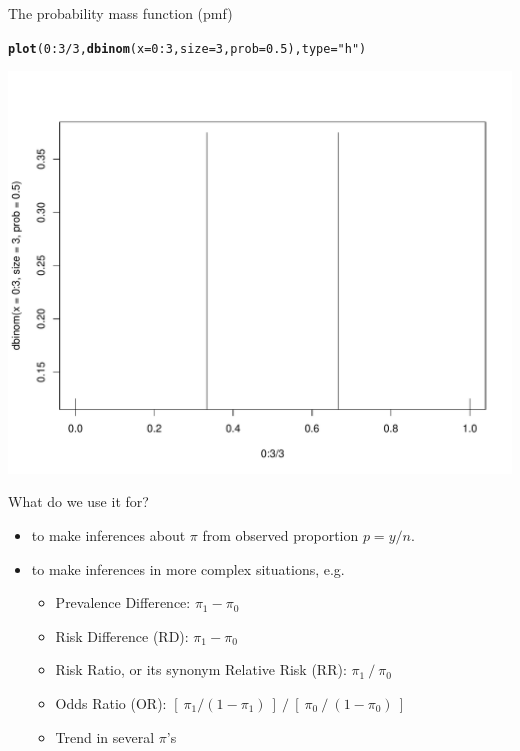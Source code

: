 \documentclass{beamer}\usepackage[]{graphicx}\usepackage[]{color}
\newcommand{\hlnum}[1]{\textcolor[rgb]{0.686,0.059,0.569}{#1}}%
\newcommand{\hlstr}[1]{\textcolor[rgb]{0.192,0.494,0.8}{#1}}%
\newcommand{\hlopt}[1]{\textcolor[rgb]{0,0,0}{#1}}%
\newcommand{\hlstd}[1]{\textcolor[rgb]{0.345,0.345,0.345}{#1}}%
\newcommand{\hlkwc}[1]{\textcolor[rgb]{0.333,0.667,0.333}{#1}}%
\newcommand{\hlkwd}[1]{\textcolor[rgb]{0.737,0.353,0.396}{\textbf{#1}}}%
\newenvironment{knitrout}{}{} %
\begin{document}
\begin{frame}[fragile]{The probability mass function (pmf)}

\begin{knitrout}\scriptsize
{}\color{fgcolor}
\begin{alltt}
\hlkwd{plot}\hlstd{(}\hlnum{0}\hlopt{:}\hlnum{3}\hlopt{/}\hlnum{3}\hlstd{,} \hlkwd{dbinom}\hlstd{(}\hlkwc{x} \hlstd{=} \hlnum{0}\hlopt{:}\hlnum{3}\hlstd{,} \hlkwc{size} \hlstd{=} \hlnum{3}\hlstd{,} \hlkwc{prob} \hlstd{=} \hlnum{0.5}\hlstd{),} \hlkwc{type} \hlstd{=} \hlstr{"h"}\hlstd{)}
\end{alltt}


{\centering \includegraphics[width=1\linewidth]{figure/unnamed-chunk-2-1} 

}



\end{knitrout}
\end{frame}

\begin{frame}[fragile]{What do we use it for?}
\small
\begin{itemize}
	\setlength\itemsep{0.7em}
	\item to make inferences about $\pi$ from  observed  proportion $p= y/n.$ \pause 
	\item to make inferences in more complex situations, e.g. 
	\begin{itemize}
			\setlength\itemsep{0.4em}
		\item Prevalence Difference: $\pi _{1} - \pi _{0}$
		\item Risk Difference (RD): $\pi _{1} - \pi _{0}$
		\item Risk Ratio, or its synonym Relative Risk (RR): $\pi _{1}\:/\:\pi _{0}$
		\item Odds Ratio (OR): $[\: \pi _{1}/(1-\pi _{1})\:] \: / \: [\: \pi _{0}\: / \: (1-\pi _{0}) \: ]$
		\item Trend in several $\pi $'s
	\end{itemize}
\end{itemize}
\end{frame}
\end{document}
